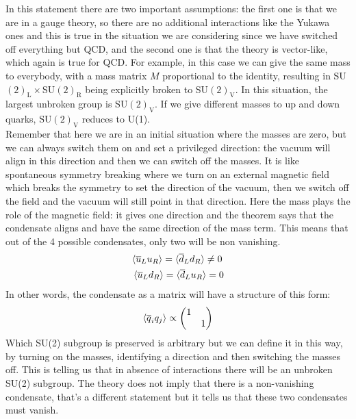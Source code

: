 \documentclass[../main.tex]{subfiles}
\begin{document}
In this statement there are two important assumptions: the first one is that we are in a gauge theory, so there are no additional interactions like the Yukawa ones and this is true in the situation we are considering since we have switched off everything but QCD, and the second one is that the theory is vector-like, which again is true for QCD. For example, in this case we can give the same mass to everybody, with a mass matrix $M$ proportional to the identity, resulting in SU$(2)_{\text{L}}\times$SU$(2)_{\text{R}}$ being explicitly broken to SU$(2)_{\text{V}}$. In this situation, the largest unbroken group is SU$(2)_{\text{V}}$. If we give different masses to up and down quarks, SU$(2)_{\text{V}}$ reduces to U(1).\\
Remember that here we are in an initial situation where the masses are zero, but we can always switch them on and set a privileged direction: the vacuum will align in this direction and then we can switch off the masses. It is like spontaneous symmetry breaking where we turn on an external magnetic field which breaks the symmetry to set the direction of the vacuum, then we switch off the field and the vacuum will still point in that direction. Here the mass plays the role of the magnetic field: it gives one direction and the theorem says that the condensate aligns and have the same direction of the mass term. This means that out of the 4 possible condensates, only two will be non vanishing.
\[
\begin{aligned}
    &\langle\overline{u}_Lu_R\rangle=\langle\overline{d}_Ld_R\rangle\neq0\\
    &\Braket{\overline{u}_Ld_R}=\langle\overline{d}_Lu_R\rangle=0
\end{aligned}
\]
In other words, the condensate as a matrix will have a structure of this form:
\[
\Braket{\overline{q}_iq_j}\propto\mqty(\dmat{1,1})
\]
Which SU(2) subgroup is preserved is arbitrary but we can define it in this way, by turning on the masses, identifying a direction and then switching the masses off. This is telling us that in absence of interactions there will be an unbroken SU(2) subgroup. The theory does not imply that there is a non-vanishing condensate, that's a different statement but it tells us that these two condensates must vanish.
\end{document}
